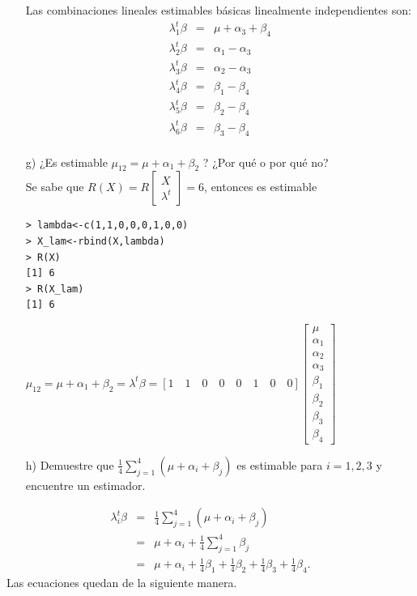 \documentclass[10pt,a4paper]{report}
\begin{document}
\begin{enumerate}
Las combinaciones lineales estimables básicas linealmente independientes son:\\

\begin{eqnarray*}
\lambda_1^t\beta &=& \mu + \alpha_3 + \beta_4\\
\lambda_2^t\beta &=& \alpha_1 - \alpha_3\\
\lambda_3^t\beta &=& \alpha_2 - \alpha_3\\
\lambda_4^t\beta &=& \beta_1 - \beta_4\\
\lambda_5^t\beta &=& \beta_2 - \beta_4\\
\lambda_6^t\beta &=& \beta_3 - \beta_4\\
\end{eqnarray*}


    \item[g)] ¿Es estimable ${\mu}_{12} = \mu + {\alpha}_{1} + {\beta}_{2}$ ? ¿Por qué o por qué no?\\
    
Se sabe que $R(X)=R\begin{bmatrix} X \\ \lambda^t
\end{bmatrix}=6$, entonces es estimable\\

\begin{verbatim}
> lambda<-c(1,1,0,0,0,1,0,0)
> X_lam<-rbind(X,lambda)
> R(X)
[1] 6
> R(X_lam)
[1] 6
\end{verbatim} 
$\mu_{12} = \mu + {\alpha}_{1} + {\beta}_{2} =\lambda^t \beta=
[1 \quad 1 \quad 0 \quad 0 \quad 0 \quad 1 \quad 0 \quad 0] 
\begin{bmatrix}
\mu \\ \alpha_1 \\ \alpha_2 \\ \alpha_3 \\ \beta_1 \\ \beta_2 \\ \beta_3 \\ \beta_4
\end{bmatrix}$
\newpage
    \item[h)] Demuestre que $\displaystyle \frac{1}{4}\sum_{j = 1}^{4}{(\mu + {\alpha}_{i} + {\beta}_{j})}$ es estimable para $i = 1,2,3$ y encuentre un estimador.
\end{enumerate}

\begin{eqnarray*}
\lambda_i^t \beta &=& \displaystyle \frac{1}{4}\sum_{j = 1}^{4}{(\mu + {\alpha}_{i} + {\beta}_{j})} \\
&=&\mu + \alpha_i + \frac{1}{4}\sum_{j = 1}^{4}\beta_{j}\\
&=& \mu + \alpha_i + \frac{1}{4}\beta_1 + \frac{1}{4}\beta_2 + \frac{1}{4}\beta_3 + \frac{1}{4}\beta_4.
\end{eqnarray*}
Las ecuaciones quedan de la siguiente manera.\\
\end{document}
